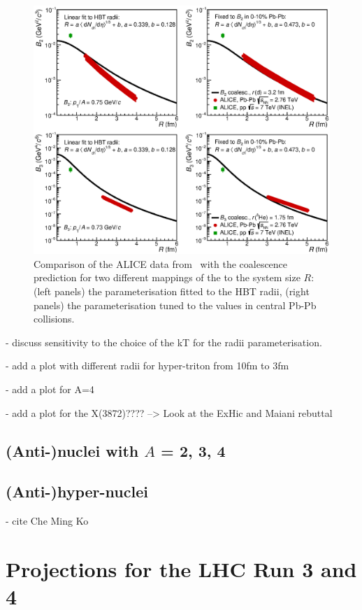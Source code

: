 \documentclass[a4paper,11pt]{scrartcl} %
\begin{document}
 \begin{figure}[htbp]
\begin{center}
\includegraphics[width=\textwidth]{radiiParamCompareData.eps}
\caption{Comparison of the ALICE data from~\cite{} with the coalescence prediction for two different mappings of the \avdNdeta to the system size $R$: (left panels) the parameterisation fitted to the HBT radii, (right panels) the parameterisation tuned to the \btwo values in central Pb-Pb collisions.}
\label{fig:CompareB2B3forDifferentParamWithData}
\end{center}
\end{figure}
 
 
- discuss sensitivity to the choice of the kT for the radii parameterisation.

- add a plot with different radii for hyper-triton from 10fm to 3fm

- add a plot for A=4

- add a plot for the X(3872)???? --> Look at the ExHic and Maiani rebuttal


\subsection{(Anti-)nuclei with $A$ = 2, 3, 4}
\subsection{(Anti-)hyper-nuclei}
- cite Che Ming Ko \cite{Zhang:2018euf} 
\section{Projections for the LHC Run 3 and 4}\label{sec:projections}
\end{document}
